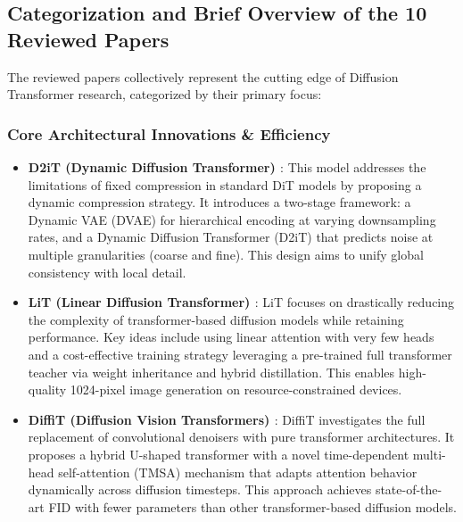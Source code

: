 \documentclass[a4paper]{article}
\begin{document}
\subsection*{Categorization and Brief Overview of the 10 Reviewed Papers}
The reviewed papers collectively represent the cutting edge of Diffusion Transformer research, categorized by their primary focus:

\subsubsection{Core Architectural Innovations \& Efficiency}
\begin{itemize}
    \item \textbf{D2iT (Dynamic Diffusion Transformer) \cite{Jia2025D2iT}}: This model addresses the limitations of fixed compression in standard DiT models by proposing a dynamic compression strategy. It introduces a two-stage framework: a Dynamic VAE (DVAE) for hierarchical encoding at varying downsampling rates, and a Dynamic Diffusion Transformer (D2iT) that predicts noise at multiple granularities (coarse and fine). This design aims to unify global consistency with local detail.
    \item \textbf{LiT (Linear Diffusion Transformer) \cite{Jiang2025LiT}}: LiT focuses on drastically reducing the complexity of transformer-based diffusion models while retaining performance. Key ideas include using linear attention with very few heads and a cost-effective training strategy leveraging a pre-trained full transformer teacher via weight inheritance and hybrid distillation. This enables high-quality 1024-pixel image generation on resource-constrained devices.
    \item \textbf{DiffiT (Diffusion Vision Transformers) \cite{Hatamizadeh2023DiffiT}}: DiffiT investigates the full replacement of convolutional denoisers with pure transformer architectures. It proposes a hybrid U-shaped transformer with a novel time-dependent multi-head self-attention (TMSA) mechanism that adapts attention behavior dynamically across diffusion timesteps. This approach achieves state-of-the-art FID with fewer parameters than other transformer-based diffusion models.
\end{itemize}
\end{document}
